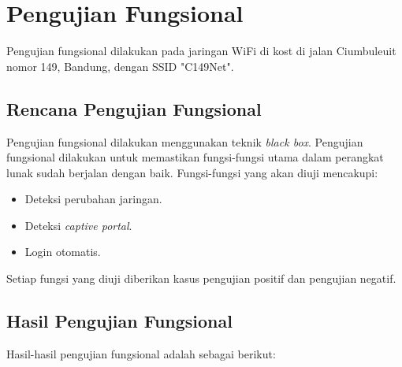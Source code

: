 \section{Pengujian Fungsional}
\label{sec:pengujian_fungsional}

Pengujian fungsional dilakukan pada jaringan WiFi di kost di jalan Ciumbuleuit nomor 149, Bandung, dengan SSID "C149Net".

\subsection{Rencana Pengujian Fungsional}
\label{subsec:rencana_pengujian_fungsional}

Pengujian fungsional dilakukan menggunakan teknik \textit{black box}. Pengujian fungsional dilakukan untuk memastikan fungsi-fungsi utama dalam perangkat lunak sudah berjalan dengan baik. Fungsi-fungsi yang akan diuji mencakupi:

\begin{itemize}
    \item{Deteksi perubahan jaringan.}
    \item{Deteksi \textit{captive portal}.}
    \item{Login otomatis.}
\end{itemize}

Setiap fungsi yang diuji diberikan kasus pengujian positif dan pengujian negatif.

\subsection{Hasil Pengujian Fungsional}
\label{subsec:hasil_pengujian_fungsional}

Hasil-hasil pengujian fungsional adalah sebagai berikut:

